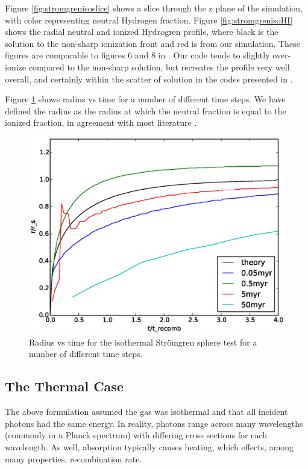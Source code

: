 Figure \ref{fig:stromgrenisoslice} shows a slice through the z plane of the simulation, with color representing neutral Hydrogen fraction. Figure \ref{fig:stromgrenisoHI} shows the radial neutral and ionized Hydrogren profile, where black is the solution to the non-sharp ionization front and red is from our simulation. These figures are comparable to figures 6 and 8 in \citet{ilievEt06}. Our code tends to slightly over-ionize compared to the non-sharp solution, but recreates the profile very well overall, and certainly within the scatter of solution in the codes presented in \citet{ilievEt06}.

Figure \ref{fig:stromgrenisorvstime} shows radius vs time for a number of different time steps. We have defined the radius as the radius at which the neutral fraction is equal to the ionized fraction, in agreement with most literature \citep{draine11,ilievEt06,tielens05}.

\begin{figure}
\includegraphics[width=\textwidth]{graphics/rvstime.eps}
\caption[Radius vs time for the isothermal Str\"omgren sphere.]{Radius vs time for the isothermal Str\"omgren sphere test for a number of different time steps.}
\label{fig:stromgrenisorvstime}
\end{figure}

\subsection{The Thermal Case}
\label{sec:thermalstromgren}

The above formulation assumed the gas was isothermal and that all incident photons had the same energy. In reality, photons range across many wavelengths (commonly in a Planck spectrum) with differing cross sections for each wavelength. As well, absorption typically causes heating, which effects, among many properties, recombination rate.

